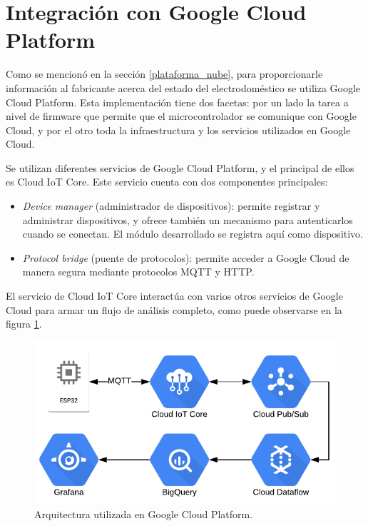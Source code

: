 \section{Integración con Google Cloud Platform}

Como se mencionó en la sección \ref{plataforma_nube}, para proporcionarle información al fabricante acerca del estado del electrodoméstico se utiliza Google Cloud Platform. Esta implementación tiene dos facetas: por un lado la tarea a nivel de firmware que permite que el microcontrolador se comunique con Google Cloud, y por el otro toda la infraestructura y los servicios utilizados en Google Cloud.

Se utilizan diferentes servicios de Google Cloud Platform, y el principal de ellos es Cloud IoT Core. Este servicio cuenta con dos componentes principales:

\begin{itemize}
	\item \emph{Device manager} (administrador de dispositivos): permite registrar y administrar dispositivos, y ofrece también un mecanismo para autenticarlos cuando se conectan. El módulo desarrollado se registra aquí como dispositivo.
	\item \emph{Protocol bridge} (puente de protocolos): permite acceder a Google Cloud de manera segura mediante protocolos MQTT y HTTP.
\end{itemize}

El servicio de Cloud IoT Core interactúa con varios otros servicios de Google Cloud para armar un flujo de análisis completo, como puede observarse en la figura \ref{fig:google_cloud_diagram}.

\begin{figure}[h]
\centering
\includegraphics[width=\textwidth]{./Figures/google_cloud_diagram.pdf}
\caption{Arquitectura utilizada en Google Cloud Platform.}
\label{fig:google_cloud_diagram}
\end{figure}

